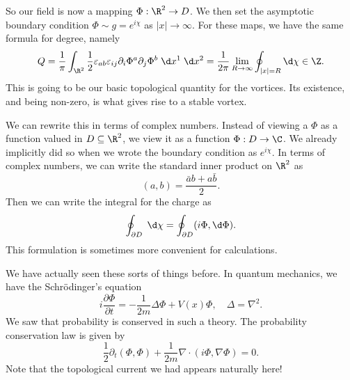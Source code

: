 \documentclass[a4paper]{article}
\begin{document}
So our field is now a mapping $\Phi: \R^2 \to D$. We then set the asymptotic boundary condition $\Phi \sim g = e^{i \chi}$ as $|x| \to \infty$. For these maps, we have the same formula for degree, namely
\[
  Q = \frac{1}{\pi} \int_{\R^2} \frac{1}{2} \varepsilon_{ab} \varepsilon_{ij} \partial_i \Phi^a \partial_j \Phi^b \;\d x^1 \;\d x^2 = \frac{1}{2\pi} \lim_{R\to \infty} \oint_{|x| = R} \d \chi \in \Z.
\]
This is going to be our basic topological quantity for the vortices. Its existence, and being non-zero, is what gives rise to a stable vortex.

We can rewrite this in terms of complex numbers. Instead of viewing a $\Phi$ as a function valued in $D \subseteq \R^2$, we view it as a function $\Phi: D \to \C$. We already implicitly did so when we wrote the boundary condition as $e^{i \chi}$. In terms of complex numbers, we can write the standard inner product on $\R^2$ as
\[
  (a, b) = \frac{\bar{a} b + a \bar{b}}{2}.
\]
Then we can write the integral for the charge as
\[
  \oint_{\partial D}\;\d \chi = \oint_{\partial D} (i\Phi, \d \Phi).
\]
This formulation is sometimes more convenient for calculations.

We have actually seen these sorts of things before. In quantum mechanics, we have the Schr\"odinger's equation
\[
  i \frac{\partial \Phi}{\partial t} = - \frac{1}{2m} \Delta \Phi + V(x) \Phi,\quad \Delta = \nabla^2.
\]
We saw that probability is conserved in such a theory. The probability conservation law is given by
\[
  \frac{1}{2} \partial_t (\Phi, \Phi) + \frac{1}{2m} \nabla \cdot (i \Phi, \nabla \Phi) = 0.
\]
Note that the topological current we had appears naturally here!

%
%

\printindex
\end{document}
